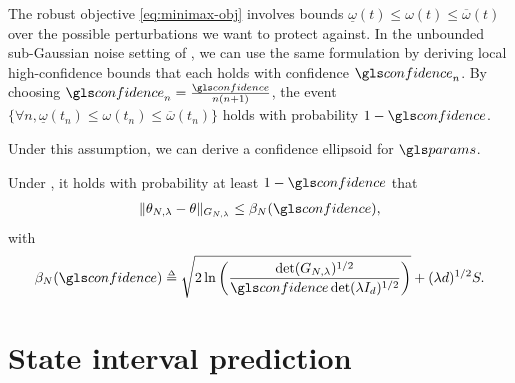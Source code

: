\begin{remark}
	\begin{leftbar}[remarkbar]
		The robust objective \eqref{eq:minimax-obj} involves bounds $\underline{\omega}(t)\leq \omega(t) \leq \overline{\omega}(t)$ over the possible perturbations we want to protect against. In the unbounded sub-Gaussian noise setting of , we can use the same formulation by deriving local high-confidence bounds that each holds with confidence $\confidence_n$. By choosing $\confidence_n = \frac{\confidence}{n(n+1)}$, the event $\{\forall n, \underline{\omega}(t_n) \leq \omega(t_n) \leq \overline{\omega}(t_n)\}$ holds with probability $1-\confidence$.
	\end{leftbar}
\end{remark}

Under this assumption, we can derive a confidence ellipsoid for $\params$.

\begin{theorem}
	\label{thm:confidence_ellipsoid}
	\begin{leftbar}[theorembar]
	Under , it holds with probability at least $1-\confidence$ that
	\begin{align}
	\label{eq:confidence-ellipsoid}
	\| \theta_{N,\lambda}  - \theta\|_{G_{N,\lambda}} \leq \beta_N(\confidence),
	\end{align}
	with
	\begin{equation}
	\label{eq:beta_n}
	\beta_N(\confidence)\eqdef \sqrt{2\ln \left(\frac{\det(G_{N,\lambda})^{1/2}}{\confidence\det(\lambda I_d)^{1/2}}\right)}
	+ (\lambda d)^{1/2}S.
	\end{equation}
	\end{leftbar}
\end{theorem}

\section{State interval prediction}

\label{sec:prediction}


